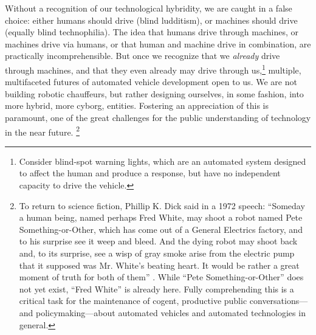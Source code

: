 

Without a recognition of our technological
hybridity, we are caught in a false choice:
either humans should drive (blind ludditism), or machines should 
drive (equally blind technophilia). The idea that humans drive through
machines, or machines drive 
via humans, or that human and machine drive in combination, are
practically incomprehensible. But once we
recognize that we \emph{already} drive through machines, and that they
even already may drive through us,\footnote{Consider blind-spot
warning lights, which are an automated system designed to affect the
human and produce a response, but have no independent capacity to drive
the vehicle.} multiple, multifaceted futures of automated vehicle
development open to us. We are not building robotic
chauffeurs, but rather designing ourselves, in some fashion, into more
hybrid, more cyborg, entities. Fostering an appreciation of this is paramount, one of the
  great challenges for the public understanding 
of technology in the near future. \footnote{To return to science fiction, Phillip K. Dick said in
a 1972 speech: ``Someday a human being, named perhaps Fred White, may shoot a robot
named Pete Something-or-Other, which has come out of a General
Electrics factory, and to his surprise see it weep and bleed. And the
dying robot may shoot back and, to its surprise, see a wisp of gray
smoke arise from the electric pump that it supposed was Mr. White's
beating heart. It would be rather a great moment of truth for both of
them'' \cite{androidHuman}.
While ``Pete Something-or-Other'' does not yet exist, ``Fred White''
is already here. Fully comprehending this is a critical task for the
maintenance of cogent, productive public conversations---and
policymaking---about automated vehicles and automated technologies in general.}



